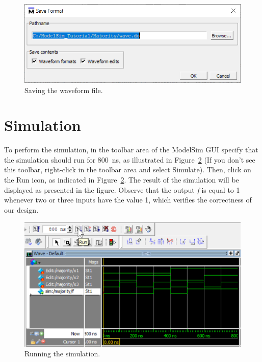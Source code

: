 \documentclass[11pt, twoside, pdftex]{article}
\begin{document}
\begin{figure}[H]
   \begin{center}
      \includegraphics[scale=1.0]{figures/figure24.png}
   \caption{Saving the waveform file.} 
	 \label{fig:24}
	 \end{center}
\end{figure}

\section{Simulation}

To perform the simulation, in the toolbar area of the ModelSim GUI specify that the simulation 
should run for 800~ns, as illustrated in Figure~\ref{fig:26} (If you don't see this toolbar, 
right-click in the toolbar area and select {\sf Simulate}). Then, click on the
{\sf Run} icon, as indicated in Figure~\ref{fig:26}. The result of the simulation will be 
displayed as presented in the figure. Observe that the output {\it f} is equal to 1 whenever 
two or three inputs have the value 1, which verifies the correctness of our design.

\begin{figure}[H]
   \begin{center}
      \includegraphics[scale=0.75]{figures/sim_run.png}
   \caption{Running the simulation.} 
	 \label{fig:26}
	 \end{center}
\end{figure}
\end{document}
